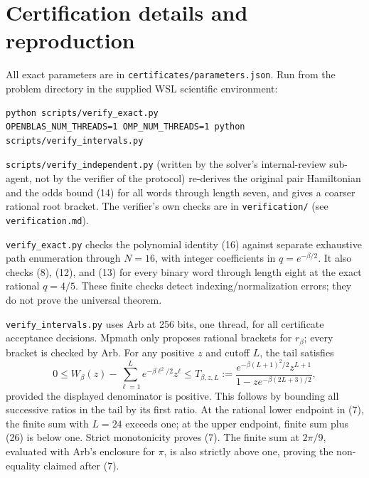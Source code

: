 \documentclass[11pt,a4paper]{report}
\begin{document}
\section{Certification details and reproduction}

All exact parameters are in \texttt{certificates/parameters.json}. Run from the problem directory in the supplied WSL scientific environment:

\begin{verbatim}
python scripts/verify_exact.py
OPENBLAS_NUM_THREADS=1 OMP_NUM_THREADS=1 python scripts/verify_intervals.py
\end{verbatim}

\texttt{scripts/verify\_independent.py} (written by the solver's internal-review sub-agent, not by the verifier of the protocol) re-derives the original pair Hamiltonian and the odds bound (14) for all words through length seven, and gives a coarser rational root bracket. The verifier's own checks are in \texttt{verification/} (see \texttt{verification.md}).

\texttt{verify\_exact.py} checks the polynomial identity (16) against separate exhaustive path enumeration through \(N=16\), with integer coefficients in \(q=e^{-\beta/2}\). It also checks (8), (12), and (13) for every binary word through length eight at the exact rational \(q=4/5\). These finite checks detect indexing/normalization errors; they do not prove the universal theorem.

\texttt{verify\_intervals.py} uses Arb at 256 bits, one thread, for all certificate acceptance decisions. Mpmath only proposes rational brackets for \(r_\beta\); every bracket is checked by Arb. For any positive \(z\) and cutoff \(L\), the tail satisfies
\[0\leq W_\beta(z)-\sum_{\ell=1}^L e^{-\beta\ell^2/2}z^\ell
 \leq T_{\beta,z,L}:=
 \frac{e^{-\beta(L+1)^2/2}z^{L+1}}
 {1-ze^{-\beta(2L+3)/2}},
 \tag{26}\]
provided the displayed denominator is positive. This follows by bounding all successive ratios in the tail by its first ratio. At the rational lower endpoint in (7), the finite sum with \(L=24\) exceeds one; at the upper endpoint, finite sum plus (26) is below one. Strict monotonicity proves (7). The finite sum at \(2\pi/9\), evaluated with Arb's enclosure for \(\pi\), is also strictly above one, proving the non-equality claimed after (7).
\end{document}
